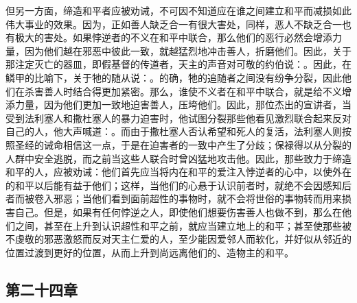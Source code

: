 但另一方面，缔造和平者应被劝诫，不可因不知道应在谁之间建立和平而减损如此伟大事业的效果。因为，正如善人缺乏合一有很大害处，同样，恶人不缺乏合一也有极大的害处。如果悖逆者的不义在和平中联合，那么他们的恶行必然会增添力量，因为他们越在邪恶中彼此一致，就越猛烈地冲击善人，折磨他们。因此，关于那注定灭亡的器皿，即假基督的传道者，天主的声音对可敬的约伯说：。因此，在鳞甲的比喻下，关于牠的随从说：。的确，牠的追随者之间没有纷争分裂，因此他们在杀害善人时结合得更加紧密。那么，谁使不义者在和平中联合，就是给不义增添力量，因为他们更加一致地迫害善人，压垮他们。因此，那位杰出的宣讲者，当受到法利塞人和撒杜塞人的暴力迫害时，他试图分裂那些他看见激烈联合起来反对自己的人，他大声喊道：。而由于撒杜塞人否认希望和死人的复活，法利塞人则按照圣经的诫命相信这一点，于是在迫害者的一致中产生了分歧；保禄得以从分裂的人群中安全逃脱，而之前当这些人联合时曾凶猛地攻击他。因此，那些致力于缔造和平的人，应被劝诫：他们首先应当将内在和平的爱注入悖逆者的心中，以使外在的和平以后能有益于他们；这样，当他们的心悬于认识前者时，就绝不会因感知后者而被卷入邪恶；当他们看到面前超性的事物时，就不会将世俗的事物转而用来损害自己。但是，如果有任何悖逆之人，即使他们想要伤害善人也做不到，那么在他们之间，甚至在上升到认识超性和平之前，就应当建立地上的和平；甚至使那些被不虔敬的邪恶激怒而反对天主仁爱的人，至少能因爱邻人而软化，并好似从邻近的位置过渡到更好的位置，从而上升到尚远离他们的、造物主的和平。\par


\subsection{第二十四章}

\par

